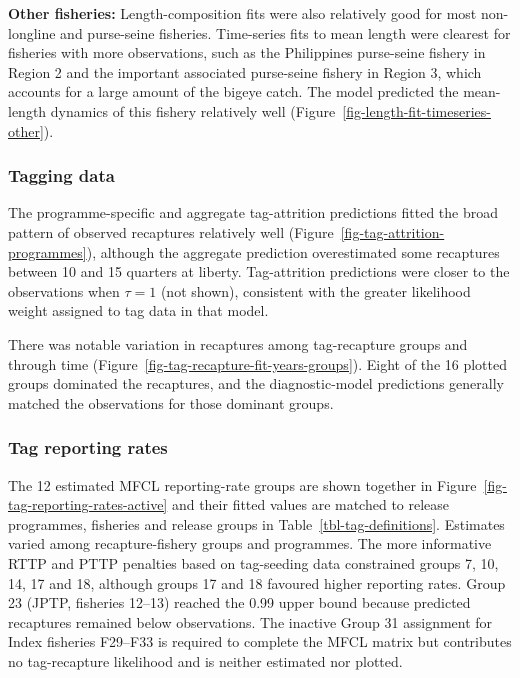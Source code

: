 \documentclass[
  english,
  a4paper,
  a4paper,
  11pt]{SCreport}
\begin{document}
\textbf{Other fisheries:} Length-composition fits were also relatively
good for most non-longline and purse-seine fisheries. Time-series fits
to mean length were clearest for fisheries with more observations, such
as the Philippines purse-seine fishery in Region 2 and the important
associated purse-seine fishery in Region 3, which accounts for a large
amount of the bigeye catch. The model predicted the mean-length dynamics
of this fishery relatively well
(Figure~\ref{fig-length-fit-timeseries-other}).

\subsubsection{Tagging data}\label{sec-fit-tagging}

The programme-specific and aggregate tag-attrition predictions fitted
the broad pattern of observed recaptures relatively well
(Figure~\ref{fig-tag-attrition-programmes}), although the aggregate
prediction overestimated some recaptures between 10 and 15 quarters at
liberty. Tag-attrition predictions were closer to the observations when
\(\tau=1\) (not shown), consistent with the greater likelihood weight
assigned to tag data in that model.

There was notable variation in recaptures among tag-recapture groups and
through time (Figure~\ref{fig-tag-recapture-fit-years-groups}). Eight of
the 16 plotted groups dominated the recaptures, and the diagnostic-model
predictions generally matched the observations for those dominant
groups.

\subsubsection{Tag reporting rates}\label{sec-tag-reporting-rates}

The 12 estimated MFCL reporting-rate groups are shown together in
Figure~\ref{fig-tag-reporting-rates-active} and their fitted values are
matched to release programmes, fisheries and release groups in
Table~\ref{tbl-tag-definitions}. Estimates varied among
recapture-fishery groups and programmes. The more informative RTTP and
PTTP penalties based on tag-seeding data constrained groups 7, 10, 14,
17 and 18, although groups 17 and 18 favoured higher reporting rates.
Group 23 (JPTP, fisheries 12--13) reached the 0.99 upper bound because
predicted recaptures remained below observations. The inactive Group 31
assignment for Index fisheries F29--F33 is required to complete the MFCL
matrix but contributes no tag-recapture likelihood and is neither
estimated nor plotted.
\end{document}
